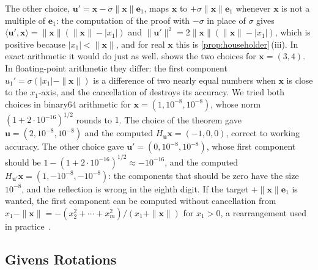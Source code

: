 The other choice, $\mathbf u'=\mathbf x-\sigma\|\mathbf x\|\mathbf e_1$, maps $\mathbf x$ to $+\sigma\|\mathbf x\|\mathbf e_1$ whenever $\mathbf x$ is not a multiple of $\mathbf e_1$: the computation of the proof with $-\sigma$ in place of $\sigma$ gives $\langle\mathbf u',\mathbf x\rangle=\|\mathbf x\|(\|\mathbf x\|-|x_1|)$ and $\|\mathbf u'\|^2=2\|\mathbf x\|(\|\mathbf x\|-|x_1|)$, which is positive because $|x_1|<\|\mathbf x\|$, and for real $\mathbf x$ this is \cref{prop:householder}\,(iii). In exact arithmetic it would do just as well.  shows the two choices for $\mathbf x=(3,4)$. In floating-point arithmetic they differ: the first component $u_1'=\sigma(|x_1|-\|\mathbf x\|)$ is a difference of two nearly equal numbers when $\mathbf x$ is close to the $x_1$-axis, and the cancellation of  destroys its accuracy. We tried both choices in binary64 arithmetic for $\mathbf x=(1,10^{-8},10^{-8})$, whose norm $(1+2\cdot10^{-16})^{1/2}$ rounds to $1$. The choice of the theorem gave $\mathbf u=(2,10^{-8},10^{-8})$ and the computed $H_{\mathbf u}\mathbf x=(-1,0,0)$, correct to working accuracy. The other choice gave $\mathbf u'=(0,10^{-8},10^{-8})$, whose first component should be $1-(1+2\cdot10^{-16})^{1/2}\approx-10^{-16}$, and the computed $H_{\mathbf u'}\mathbf x=(1,-10^{-8},-10^{-8})$: the components that should be zero have the size $10^{-8}$, and the reflection is wrong in the eighth digit. If the target $+\|\mathbf x\|\mathbf e_1$ is wanted, the first component can be computed without cancellation from $x_1-\|\mathbf x\|=-(x_2^2+\cdots+x_m^2)/(x_1+\|\mathbf x\|)$ for $x_1>0$, a rearrangement used in practice~\cite[Sect.~5.1]{golub2013}.

\subsection{Givens Rotations}

